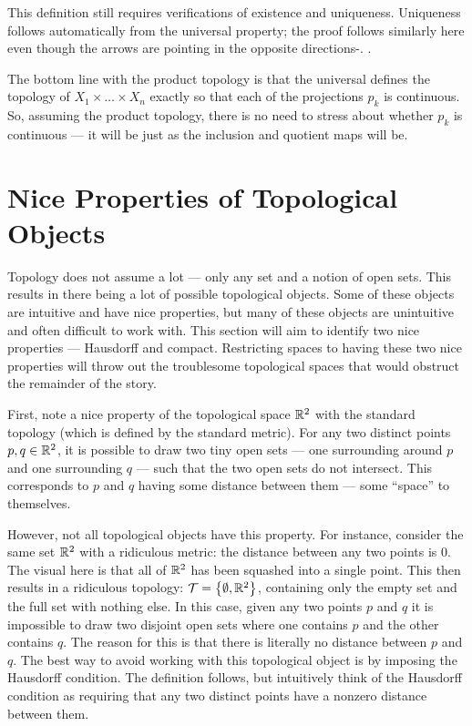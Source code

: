 \documentclass[../sean_thesis.tex]{subfiles}
\begin{document}
This definition still requires verifications of existence and uniqueness. Uniqueness follows automatically from the universal property; the proof follows similarly here even though the arrows are pointing in the opposite directions-. .

The bottom line with the product topology is that the universal defines the topology of $X_1 \times \dots \times X_n$ exactly so that each of the projections $p_k$ is continuous. So, assuming the product topology, there is no need to stress about whether $p_k$ is continuous --- it will be just as the inclusion and quotient maps will be.

\section{Nice Properties of Topological Objects}
Topology does not assume a lot --- only any set and a notion of open sets. This results in there being a lot of possible topological objects. Some of these objects are intuitive and have nice properties, but many of these objects are unintuitive and often difficult to work with. This section will aim to identify two nice properties --- Hausdorff and compact. Restricting spaces to having these two nice properties will throw out the troublesome topological spaces that would obstruct the remainder of the story.

First, note a nice property of the topological space $\mathbb{R}^2$ with the standard topology (which is defined by the standard metric). For any two distinct points $p,q \in \mathbb{R}^2$, it is possible to draw two tiny open sets --- one surrounding around $p$ and one surrounding $q$ --- such that the two open sets do not intersect. This corresponds to $p$ and $q$ having some distance between them --- some ``space'' to themselves. 

However, not all topological objects have this property. For instance, consider the same set $\mathbb{R}^2$ with a ridiculous metric: the distance between any two points is $0$. The visual here is that all of $\mathbb{R}^2$ has been squashed into a single point. This then results in a ridiculous topology: $\mathcal{T} = \left\{\emptyset, \mathbb{R}^2\right\}$, containing only the empty set and the full set with nothing else. In this case, given any two points $p$ and $q$ it is impossible to draw two disjoint open sets where one contains $p$ and the other contains $q$. The reason for this is that there is literally no distance between $p$ and $q$. The best way to avoid working with this topological object is by imposing the Hausdorff condition. The definition follows, but intuitively think of the Hausdorff condition as requiring that any two distinct points have a nonzero distance between them.
\end{document}
